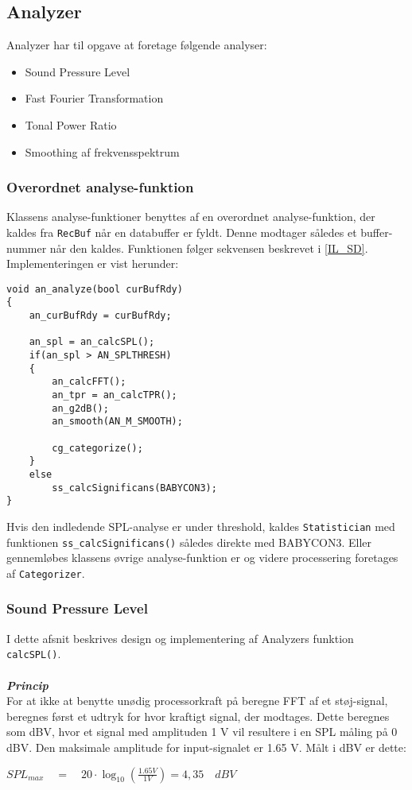 \subsection{Analyzer}
Analyzer har til opgave at foretage følgende analyser:
\begin{itemize}
	\item Sound Pressure Level
	\item Fast Fourier Transformation
	\item Tonal Power Ratio
	\item Smoothing af frekvensspektrum
\end{itemize}

\subsubsection{Overordnet analyse-funktion}
Klassens analyse-funktioner benyttes af en overordnet analyse-funktion, der kaldes fra \verb+RecBuf+ når en databuffer er fyldt. Denne modtager således et buffer-nummer når den kaldes. Funktionen følger sekvensen beskrevet i \ref{IL_SD}. Implementeringen er vist herunder:
\begin{verbatim}void an_analyze(bool curBufRdy)
{
    an_curBufRdy = curBufRdy;

    an_spl = an_calcSPL();
    if(an_spl > AN_SPLTHRESH)
    {
        an_calcFFT();			
        an_tpr = an_calcTPR();
        an_g2dB();
        an_smooth(AN_M_SMOOTH);

        cg_categorize();
    }
    else
        ss_calcSignificans(BABYCON3);
}\end{verbatim}
Hvis den indledende SPL-analyse er under threshold, kaldes \verb+Statistician+ med funktionen \verb+ss_calcSignificans()+ således direkte med BABYCON3. Eller gennemløbes klassens øvrige analyse-funktion er og videre processering foretages af \verb+Categorizer+.

\subsubsection{Sound Pressure Level} \label{an_spl}
I dette afsnit beskrives design og implementering af Analyzers funktion \verb+calcSPL()+.\\ \\
\textbf{\textit{Princip}}\\
For at ikke at benytte unødig processorkraft på beregne FFT af et støj-signal, beregnes først et udtryk for hvor kraftigt signal, der modtages. Dette beregnes som dBV, hvor et signal med amplituden 1 V vil resultere i en SPL måling på 0 dBV. Den maksimale amplitude for input-signalet er 1.65 V. Målt i dBV er dette:
\begin{center}
${ SPL }_{ max }\quad =\quad 20\cdot \log _{ 10 }{ \left( \frac { 1.65V }{ 1V }  \right)  } =4,35\quad dBV$
\end{center}

